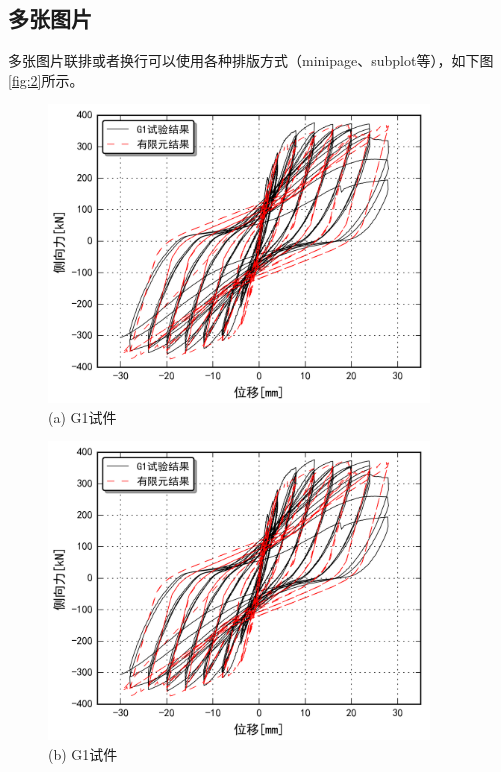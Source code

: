 \documentclass{bjtuthesis}
\begin{document}
\subsection{多张图片}
多张图片联排或者换行可以使用各种排版方式（minipage、subplot等），如下图\ref{fig:2}所示。
\begin{figure}
\centering
\begin{minipage}[t]{0.48\textwidth}
\centering
\includegraphics[width=0.9\textwidth]{pic/G1.png}\\
{(a) G1试件}
\end{minipage}
\begin{minipage}[t]{0.48\textwidth}
\centering
\includegraphics[width=0.9\textwidth]{pic/G1.png}\\
{(b) G1试件}
\end{minipage}
\end{figure}
\end{document}
